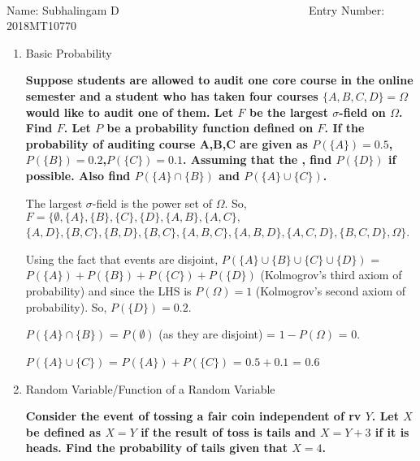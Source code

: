 \documentclass[12pt, oneside]{article}
\begin{document}
\setlength{\textheight}{8.5in}
\\





\vskip 0.5cm

\noindent Name: Subhalingam D~~ ~~~  ~~~~~ ~~~~ ~~~~~~~~~~~~~~~~ Entry Number: 2018MT10770~~~~~~~~~~~



\vskip 0.5cm



\begin{enumerate}

\item Basic Probability

\noindent \textbf{Suppose students are allowed to audit one core course in the online semester and a student who has taken four courses $\{A,B,C,D\}=\Omega$ would like to audit one of them. Let $F$ be the largest $\sigma$-field on $\Omega$. Find $F$. Let $P$ be a probability function defined on $F$. If the probability of auditing course A,B,C are given as $P(\{A\})=0.5$,$P(\{B\})=0.2$,$P(\{C\})=0.1$. Assuming that the , find $P(\{D\})$ if possible. Also find $P(\{A\}\cap\{B\})$ and $P(\{A\}\cup\{C\})$. 
}

The largest $\sigma$-field is the power set of $\Omega$. So, $F=\{\emptyset,\{A\},\{B\},\{C\},\{D\},\{A,B\},\{A,C\},$\\$ \{A,D\},\{B,C\},\{B,D\},\{B,C\},\{A,B,C\},\{A,B,D\},\{A,C,D\},\{B,C,D\},\Omega\}$.

Using the fact that events are disjoint, $P(\{A\}\cup\{B\}\cup\{C\}\cup\{D\})$ = $P(\{A\}) + P(\{B\}) + P(\{C\}) + P(\{D\})$ (Kolmogrov's third axiom of probability) and since the LHS is $P(\Omega)=1$ (Kolmogrov's second axiom of probability). So, $P(\{D\}) = 0.2$.

$P(\{A\}\cap\{B\})$ = $P(\emptyset)$ (as they are disjoint) = $1-P(\Omega)$ = 0.

$P(\{A\}\cup\{C\})$ = $P(\{A\}) + P(\{C\})$ = $0.5+0.1$ = 0.6



\item Random Variable/Function of a Random Variable

\noindent\textbf{Consider the event of tossing a fair coin independent of rv $Y$. Let $X$ be defined as $X=Y$ if the result of toss is tails and $X=Y+3$ if it is heads. Find the probability of tails given that $X=4$.
}


\end{enumerate}
\end{document}

